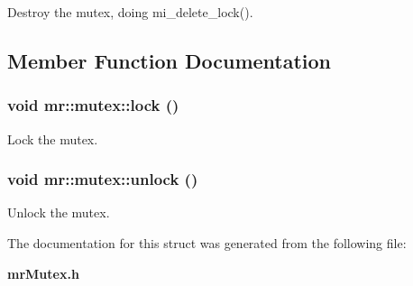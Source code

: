 Destroy the mutex, doing mi\_\-delete\_\-lock(). 



\subsection{Member Function Documentation}
\subsubsection{\setlength{\rightskip}{0pt plus 5cm}void mr::mutex::lock ()\hspace{0.3cm}{\tt  [inline]}}\label{structmr_1_1mutex_a2}


Lock the mutex. 

\subsubsection{\setlength{\rightskip}{0pt plus 5cm}void mr::mutex::unlock ()\hspace{0.3cm}{\tt  [inline]}}\label{structmr_1_1mutex_a3}


Unlock the mutex. 



The documentation for this struct was generated from the following file:\begin{CompactItemize}
\item 
{\bf mr\-Mutex.h}\end{CompactItemize}
